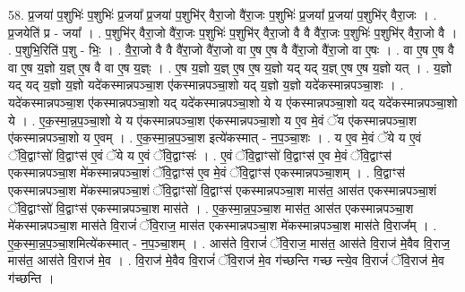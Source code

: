 \documentclass[17pt]{extarticle}
\begin{document}
58. प्र॒जया॑ प॒शुभिः॑ प॒शुभिः॑ प्र॒जया᳚ प्र॒जया॑ प॒शुभि॑र् वैरा॒जो वै॑रा॒जः प॒शुभिः॑ प्र॒जया᳚ प्र॒जया॑ प॒शुभि॑र् वैरा॒जः । . प्र॒जयेति॑ प्र - जया᳚ । . प॒शुभि॑र् वैरा॒जो वै॑रा॒जः प॒शुभिः॑ प॒शुभि॑र् वैरा॒जो वै वै वै॑रा॒जः प॒शुभिः॑ प॒शुभि॑र् वैरा॒जो वै । . प॒शुभि॒रिति॑ प॒शु - भिः॒ । . वै॒रा॒जो वै वै वै॑रा॒जो वै॑रा॒जो वा ए॒ष ए॒ष वै वै॑रा॒जो वै॑रा॒जो वा ए॒षः । . वा ए॒ष ए॒ष वै वा ए॒ष य॒ज्ञो य॒ज्ञ् ए॒ष वै वा ए॒ष य॒ज्ञ्ः । . ए॒ष य॒ज्ञो य॒ज्ञ् ए॒ष ए॒ष य॒ज्ञो यद् यद् य॒ज्ञ् ए॒ष ए॒ष य॒ज्ञो यत् । . य॒ज्ञो यद् यद् य॒ज्ञो य॒ज्ञो यदे॑कस्मान्नपञ्चा॒श ए॑कस्मान्नपञ्चा॒शो यद् य॒ज्ञो य॒ज्ञो 
यदे॑कस्मान्नपञ्चा॒शः । . यदे॑कस्मान्नपञ्चा॒श ए॑कस्मान्नपञ्चा॒शो यद् यदे॑कस्मान्नपञ्चा॒शो ये य ए॑कस्मान्नपञ्चा॒शो यद् 
यदे॑कस्मान्नपञ्चा॒शो ये । . ए॒क॒स्मा॒न्न॒प॒ञ्चा॒शो ये य ए॑कस्मान्नपञ्चा॒श ए॑कस्मान्नपञ्चा॒शो य ए॒व मे॒वं ॅय ए॑कस्मान्नपञ्चा॒श ए॑कस्मान्नपञ्चा॒शो य ए॒वम् । . ए॒क॒स्मा॒न्न॒प॒ञ्चा॒श इत्ये॑कस्मात् - न॒प॒ञ्चा॒शः । . य ए॒व मे॒वं ॅये य ए॒वं ॅवि॒द्वाꣳसो॑ वि॒द्वाꣳस॑ ए॒वं ॅये य ए॒वं ॅवि॒द्वाꣳसः॑ । . ए॒वं ॅवि॒द्वाꣳसो॑ वि॒द्वाꣳस॑ ए॒व मे॒वं ॅवि॒द्वाꣳस॑ एकस्मान्नपञ्चा॒श मे॑कस्मान्नपञ्चा॒शं ॅवि॒द्वाꣳस॑ ए॒व मे॒वं ॅवि॒द्वाꣳस॑ एकस्मान्नपञ्चा॒शम् । . वि॒द्वाꣳस॑ एकस्मान्नपञ्चा॒श मे॑कस्मान्नपञ्चा॒शं ॅवि॒द्वाꣳसो॑ वि॒द्वाꣳस॑ एकस्मान्नपञ्चा॒श मास॑त॒ आस॑त एकस्मान्नपञ्चा॒शं ॅवि॒द्वाꣳसो॑ वि॒द्वाꣳस॑ एकस्मान्नपञ्चा॒श मास॑ते । . ए॒क॒स्मा॒न्न॒प॒ञ्चा॒श मास॑त॒ आस॑त एकस्मान्नपञ्चा॒श मे॑कस्मान्नपञ्चा॒श मास॑ते वि॒राजं॑ ॅवि॒राज॒ मास॑त एकस्मान्नपञ्चा॒श मे॑कस्मान्नपञ्चा॒श मास॑ते वि॒राज᳚म् । . ए॒क॒स्मा॒न्न॒प॒ञ्चा॒शमित्ये॑कस्मात् - न॒प॒ञ्चा॒शम् । . आस॑ते वि॒राजं॑ ॅवि॒राज॒ मास॑त॒ आस॑ते वि॒राज॑ मे॒वैव वि॒राज॒ मास॑त॒ आस॑ते वि॒राज॑ मे॒व । . वि॒राज॑ मे॒वैव वि॒राजं॑ ॅवि॒राज॑ मे॒व ग॑च्छन्ति गच्छ न्त्ये॒व वि॒राजं॑ ॅवि॒राज॑ मे॒व ग॑च्छन्ति । \newline
\end{document}
